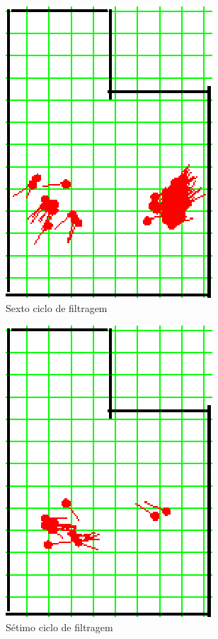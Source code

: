 \begin{figure}[H]
  \centering
  \includegraphics[scale=1]{figuras/cen4_ex1/7.eps}
  \caption[Sexto Ciclo de Filtragem]{Sexto ciclo de filtragem}
  \label{img:cen4_ex1_7}
\end{figure}

\begin{figure}[H]
  \centering
  \includegraphics[scale=1]{figuras/cen4_ex1/8.eps}
  \caption[Sétimo Ciclo de Filtragem]{Sétimo ciclo de filtragem}
  \label{img:cen4_ex1_8}
\end{figure}

